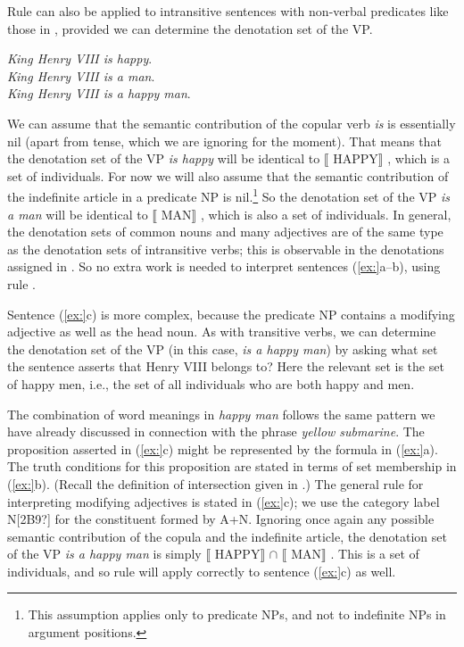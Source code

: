 Rule  can also be applied to intransitive sentences with non-verbal predicates like those in , provided we can determine the denotation set of the VP.


\ea
\ea \textit{King Henry VIII is happy}.\\
\ex \textit{King Henry VIII is a man}.\\
\ex \textit{King Henry VIII is a happy man}.
                       \z
\z


We can assume that the semantic contribution of the copular verb \textit{is} is essentially nil (apart from tense, which we are ignoring for the moment). That means that the denotation set of the VP \textit{is happy} will be identical to $\llbracket$ HAPPY$\rrbracket$ , which is a set of individuals. For now we will also assume that the semantic contribution of the indefinite article in a predicate NP is nil.\footnote{This assumption applies only to predicate NPs, and not to indefinite NPs in argument positions.} So the denotation set of the VP \textit{is a man} will be identical to $\llbracket$ MAN$\rrbracket$ , which is also a set of individuals. In general, the denotation sets of common nouns and many adjectives are of the same type as the denotation sets of intransitive verbs; this is observable in the denotations assigned in . So no extra work is needed to interpret sentences (\ref{ex:}a--b), using rule .



Sentence (\ref{ex:}c) is more complex, because the predicate NP contains a modifying adjective as well as the head noun. As with transitive verbs, we can determine the denotation set of the VP (in this case, \textit{is a happy man}) by asking what set the sentence asserts that Henry VIII belongs to? Here the relevant set is the set of happy men, i.e., the set of all individuals who are both happy and men.



The combination of word meanings in \textit{happy man} follows the same pattern we have already discussed in connection with the phrase \textit{yellow submarine}. The proposition asserted in (\ref{ex:}c) might be represented by the formula in (\ref{ex:}a). The truth conditions for this proposition are stated in terms of set membership in (\ref{ex:}b). (Recall the definition of intersection given in .) The general rule for interpreting modifying adjectives is stated in (\ref{ex:}c); we use the category label N[2B9?] for the constituent formed by A+N. Ignoring once again any possible semantic contribution of the copula and the indefinite article, the denotation set of the VP \textit{is a happy man} is simply $\llbracket$ HAPPY$\rrbracket$  ${\cap}$ $\llbracket$ MAN$\rrbracket$ . This is a set of individuals, and so rule  will apply correctly to sentence (\ref{ex:}c) as well.


